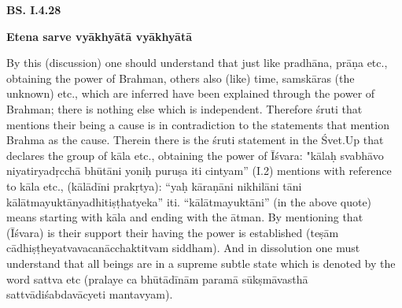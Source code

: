 \textbf{}


\textbf{BS. I.4.28}

\textbf{Etena sarve vyākhyātā vyākhyātā}

By this (discussion) one should understand that just like pradhāna, prāṇa etc., obtaining the power of Brahman, others also (like) time,  samskāras (the unknown) etc., which are inferred have been explained through the power of Brahman; there is nothing else which is independent. Therefore śruti that mentions their being a cause is in contradiction to the statements that mention Brahma as the cause. Therein there is the śruti statement in the Śvet.Up that declares the group of kāla etc., obtaining the power of Īśvara: "kālaḥ svabhāvo niyatiryadṛcchā bhūtāni yoniḥ puruṣa iti cintyam” (I.2)  mentions with reference to kāla etc., (kālādīni prakṛtya): “yaḥ kāraṇāni nikhilāni tāni kālātmayuktānyadhitiṣṭhatyeka” iti. “kālātmayuktāni” (in the above quote) means starting with kāla and ending with the ātman. By mentioning that (Īśvara) is their support their having the power is established (teṣām cādhiṣṭheyatvavacanācchaktitvam siddham). And in dissolution one must understand that all beings are in a supreme subtle state which is denoted by the word sattva etc (pralaye ca bhūtādīnām paramā sūkṣmāvasthā sattvādiśabdavācyeti mantavyam).




